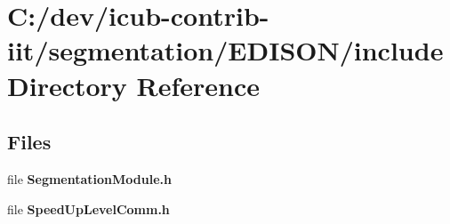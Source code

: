 \section{C\+:/dev/icub-\/contrib-\/iit/segmentation/\+E\+D\+I\+S\+O\+N/include Directory Reference}
\label{dir_ecf62e3282e881a5ee8afa1da2f46c7d}
\subsection*{Files}
\begin{DoxyCompactItemize}
\item 
file {\bfseries Segmentation\+Module.\+h}
\item 
file {\bfseries Speed\+Up\+Level\+Comm.\+h}
\end{DoxyCompactItemize}
